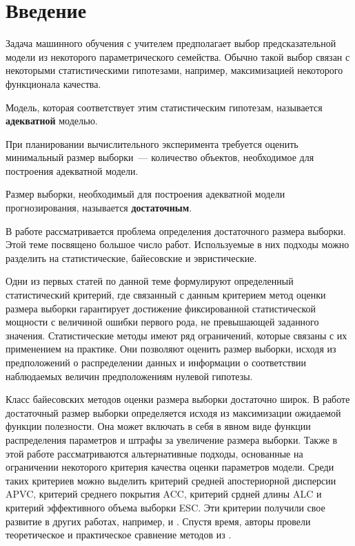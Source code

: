 \section{Введение}

Задача машинного обучения с учителем предполагает выбор предсказательной модели из некоторого параметрического семейства. Обычно такой выбор связан с некоторыми статистическими гипотезами, например, максимизацией некоторого функционала качества. 
\begin{definition}
    Модель, которая соответствует этим статистическим гипотезам, называется \textbf{адекватной} моделью.
\end{definition}

При планировании вычислительного эксперимента требуется оценить минимальный размер выборки~--- количество объектов, необходимое для построения адекватной модели.

\begin{definition}
    Размер выборки, необходимый для построения адекватной модели прогнозирования, называется \textbf{достаточным}.
\end{definition}

В работе рассматривается проблема определения достаточного размера выборки. Этой теме посвящено большое число работ. Используемые в них подходы можно разделить на статистические, байесовские и эвристические.

Одни из первых статей по данной теме \cite{Adcock1988, Joseph1995} формулируют определенный статистический критерий, где связанный с данным критерием метод оценки размера выборки гарантирует достижение фиксированной статистической мощности с величиной ошибки первого рода, не превышающей заданного значения. Статистические методы имеют ряд ограничений, которые связаны с их применением на практике. Они позволяют оценить размер выборки, исходя из предположений о распределении данных и информации о соответствии наблюдаемых величин предположениям нулевой гипотезы.

Класс байесовских методов оценки размера выборки достаточно широк. 
В работе \cite{Lindley1997} достаточный размер выборки определяется исходя из максимизации ожидаемой функции полезности. Она может включать в себя в явном виде функции распределения параметров и штрафы за увеличение размера выборки. Также в этой работе рассматриваются альтернативные подходы, основанные на ограничении некоторого критерия качества оценки параметров модели. Среди таких критериев можно выделить критерий средней апостериорной дисперсии APVC, критерий среднего покрытия ACC, критерий срдней длины ALC и критерий эффективного объема выборки ESC. Эти критерии получили свое развитие в других работах, например, \cite{PhamGia1997} и \cite{Gelfand2002}. Спустя время, авторы \cite{Cao2009} провели теоретическое и практическое сравнение методов из \cite{Adcock1988, Joseph1995, Lindley1997}.

